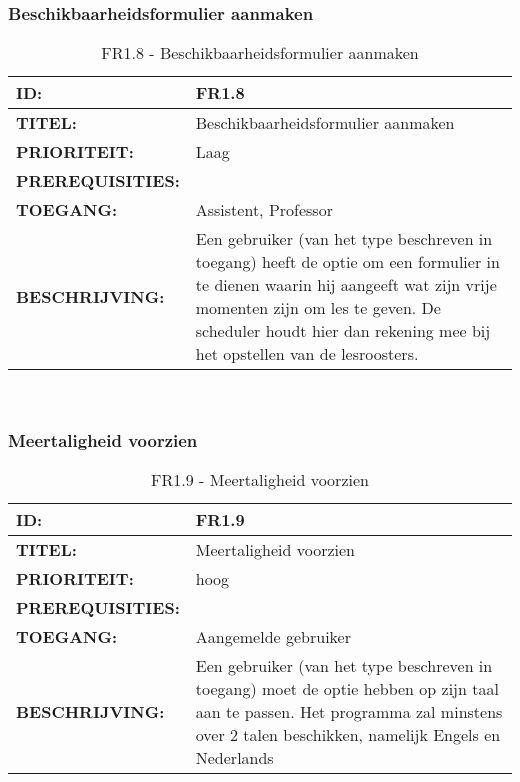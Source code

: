 
\subsubsection{Beschikbaarheidsformulier aanmaken}  
\noindent\begin{table}[H]
            \begin{tabular}{l | p{10cm}}
                \textbf{ID:} & FR1.8 \\ \hline
                \textbf{TITEL:} & Beschikbaarheidsformulier aanmaken\\ \hline
                \textbf{PRIORITEIT:} &  Laag \\ \hline
                \textbf{PREREQUISITIES:} & \\ \hline
                \textbf{TOEGANG:} & Assistent, Professor \\ \hline
                \textbf{BESCHRIJVING:} & Een gebruiker (van het type beschreven in toegang) heeft de optie om een formulier in te dienen waarin hij aangeeft wat zijn vrije momenten zijn om les te geven. De scheduler houdt hier dan rekening mee bij het opstellen van de lesroosters.\\ 
            \end{tabular}\\
            \caption{FR1.8 - Beschikbaarheidsformulier aanmaken}
            \label{tab:FR1.8 - Beschikbaarheidsformulier aanmaken}
        \end{table}
        
\subsubsection{Meertaligheid voorzien}  
\noindent\begin{table}[H]
            \begin{tabular}{l | p{10cm}}
                \textbf{ID:} & FR1.9 \\ \hline
                \textbf{TITEL:} & Meertaligheid voorzien\\ \hline
                \textbf{PRIORITEIT:} &  hoog \\ \hline
                \textbf{PREREQUISITIES:} & \\ \hline
                \textbf{TOEGANG:} & Aangemelde gebruiker \\ \hline
                \textbf{BESCHRIJVING:} & Een gebruiker (van het type beschreven in toegang) moet de optie hebben op zijn taal aan te passen. Het programma zal minstens over 2 talen beschikken, namelijk Engels en Nederlands\\ 
            \end{tabular}\\
            \caption{FR1.9 - Meertaligheid voorzien}
            \label{tab:FR1.9 - Meertaligheid voorzien}
        \end{table}

\clearpage
